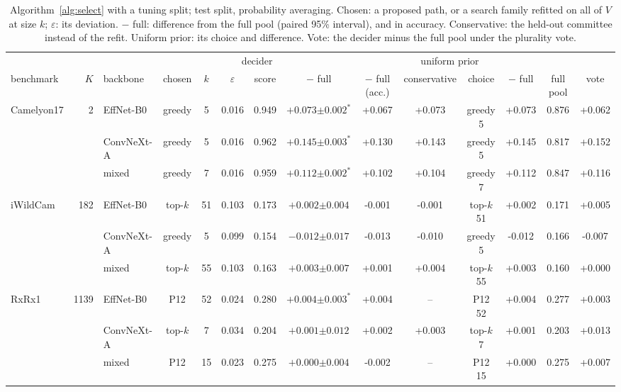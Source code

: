 \begin{table}[t]
\centering
\footnotesize
\caption{Algorithm~\ref{alg:select} with a tuning split; test split, probability averaging. Chosen: a proposed path, or a search family refitted on all of $V$ at size $k$; $\varepsilon$: its deviation. $-$ full: difference from the full pool (paired 95\% interval), and in accuracy. Conservative: the held-out committee instead of the refit. Uniform prior: its choice and difference. Vote: the decider minus the full pool under the plurality vote.}
\label{tab:method}
\setlength{\tabcolsep}{2.5pt}\begin{adjustbox}{max width=\linewidth}
\begin{tabular}{lrlccccccccccc}
\toprule
& & & \multicolumn{5}{c}{decider} & & \multicolumn{2}{c}{uniform prior} & & \\ \cmidrule(lr){4-8}\cmidrule(lr){10-11} benchmark & $K$ & backbone & chosen & $k$ & $\varepsilon$ & score & $-$ full & $-$ full (acc.) & conservative & choice & $-$ full & full pool & vote \\
\midrule
Camelyon17 & 2 & EffNet-B0 & greedy & 5 & 0.016 & 0.949 & $+0.073{\scriptstyle\pm0.002}^{\ast}$ & +0.067 & +0.073 & greedy 5 & +0.073 & 0.876 & +0.062 \\
 &  & ConvNeXt-A & greedy & 5 & 0.016 & 0.962 & $+0.145{\scriptstyle\pm0.003}^{\ast}$ & +0.130 & +0.143 & greedy 5 & +0.145 & 0.817 & +0.152 \\
 &  & mixed & greedy & 7 & 0.016 & 0.959 & $+0.112{\scriptstyle\pm0.002}^{\ast}$ & +0.102 & +0.104 & greedy 7 & +0.112 & 0.847 & +0.116 \\
\addlinespace
iWildCam & 182 & EffNet-B0 & top-$k$ & 51 & 0.103 & 0.173 & $+0.002{\scriptstyle\pm0.004}$ & -0.001 & -0.001 & top-$k$ 51 & +0.002 & 0.171 & +0.005 \\
 &  & ConvNeXt-A & greedy & 5 & 0.099 & 0.154 & $-0.012{\scriptstyle\pm0.017}$ & -0.013 & -0.010 & greedy 5 & -0.012 & 0.166 & -0.007 \\
 &  & mixed & top-$k$ & 55 & 0.103 & 0.163 & $+0.003{\scriptstyle\pm0.007}$ & +0.001 & +0.004 & top-$k$ 55 & +0.003 & 0.160 & +0.000 \\
\addlinespace
RxRx1 & 1139 & EffNet-B0 & P12 & 52 & 0.024 & 0.280 & $+0.004{\scriptstyle\pm0.003}^{\ast}$ & +0.004 & -- & P12 52 & +0.004 & 0.277 & +0.003 \\
 &  & ConvNeXt-A & top-$k$ & 7 & 0.034 & 0.204 & $+0.001{\scriptstyle\pm0.012}$ & +0.002 & +0.003 & top-$k$ 7 & +0.001 & 0.203 & +0.013 \\
 &  & mixed & P12 & 15 & 0.023 & 0.275 & $+0.000{\scriptstyle\pm0.004}$ & -0.002 & -- & P12 15 & +0.000 & 0.275 & +0.007 \\
\bottomrule
\end{tabular}
\end{adjustbox}
\end{table}
